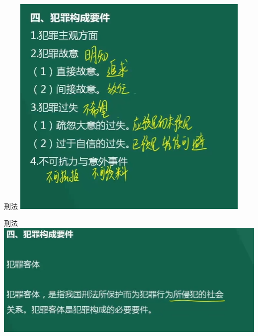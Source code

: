 \documentclass[aspectratio=169]{beamer}
\begin{document}
\begin{frame}[t]{刑法}
    \includegraphics[scale=0.4]{criminal_host}\\ 
\end{frame}




\begin{frame}[t]{刑法}
    \includegraphics[scale=0.4]{criminal_guest}\\ 
\end{frame}
\end{document}
